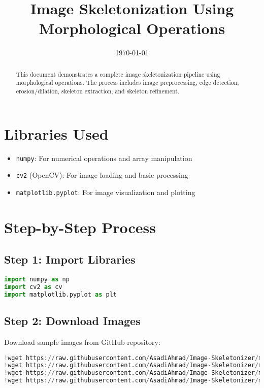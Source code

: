 \documentclass[12pt]{article}
\title{Image Skeletonization Using Morphological Operations}
\date{\today}
\begin{document}
\maketitle

\begin{abstract}
This document demonstrates a complete image skeletonization pipeline using morphological operations. The process includes image preprocessing, edge detection, erosion/dilation, skeleton extraction, and skeleton refinement.
\end{abstract}

\section{Libraries Used}
\begin{itemize}
    \item \texttt{numpy}: For numerical operations and array manipulation
    \item \texttt{cv2} (OpenCV): For image loading and basic processing
    \item \texttt{matplotlib.pyplot}: For image visualization and plotting
\end{itemize}

\section{Step-by-Step Process}

\subsection{Step 1: Import Libraries}
\begin{lstlisting}[language=Python]
import numpy as np
import cv2 as cv
import matplotlib.pyplot as plt
\end{lstlisting}

\subsection{Step 2: Download Images}
Download sample images from GitHub repository:
\begin{lstlisting}[language=Python]
!wget https://raw.githubusercontent.com/AsadiAhmad/Image-Skeletonizer/main/Pictures/hand.jpg -O hand.jpg
!wget https://raw.githubusercontent.com/AsadiAhmad/Image-Skeletonizer/main/Pictures/shark.jpg -O shark.jpg
!wget https://raw.githubusercontent.com/AsadiAhmad/Image-Skeletonizer/main/Pictures/human.jpg -O human.jpg
!wget https://raw.githubusercontent.com/AsadiAhmad/Image-Skeletonizer/main/Pictures/cow.jpg -O cow.jpg
\end{lstlisting}
\end{document}
